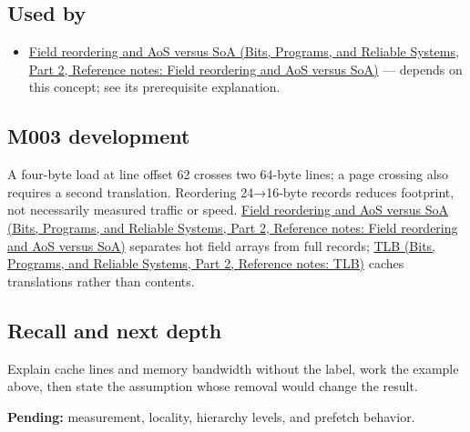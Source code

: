 \subsection{Used by}\label{appendix-e4ccdbab8320-used-by}

\hypertarget{appendix-e4ccdbab8320-used-by}{}

\begin{itemize}
\tightlist
\item
  \href{../01-Bits-Programs-and-Reliable-Systems-P02/main.pdf\#nameddest=appendix-5522ad176ca0}{Field reordering and AoS versus SoA (Bits, Programs, and Reliable Systems, Part 2, Reference notes: Field reordering and AoS versus SoA)} --- depends on this concept; see its prerequisite explanation.
\end{itemize}

\subsection{M003 development}\label{appendix-e4ccdbab8320-m003-development}

\hypertarget{appendix-e4ccdbab8320-m003-development}{}

A four-byte load at line offset 62 crosses two 64-byte lines; a page crossing also requires a second translation. Reordering 24→16-byte records reduces footprint, not necessarily measured traffic or speed. \href{../01-Bits-Programs-and-Reliable-Systems-P02/main.pdf\#nameddest=appendix-5522ad176ca0}{Field reordering and AoS versus SoA (Bits, Programs, and Reliable Systems, Part 2, Reference notes: Field reordering and AoS versus SoA)} separates hot field arrays from full records; \href{../01-Bits-Programs-and-Reliable-Systems-P02/main.pdf\#nameddest=appendix-7a2d9c5ce511}{TLB (Bits, Programs, and Reliable Systems, Part 2, Reference notes: TLB)} caches translations rather than contents.

\subsection{Recall and next depth}\label{appendix-e4ccdbab8320-recall-and-next-depth}

\hypertarget{appendix-e4ccdbab8320-recall-and-next-depth}{}

Explain cache lines and memory bandwidth without the label, work the example above, then state the assumption whose removal would change the result.

\textbf{Pending:} measurement, locality, hierarchy levels, and prefetch behavior.

